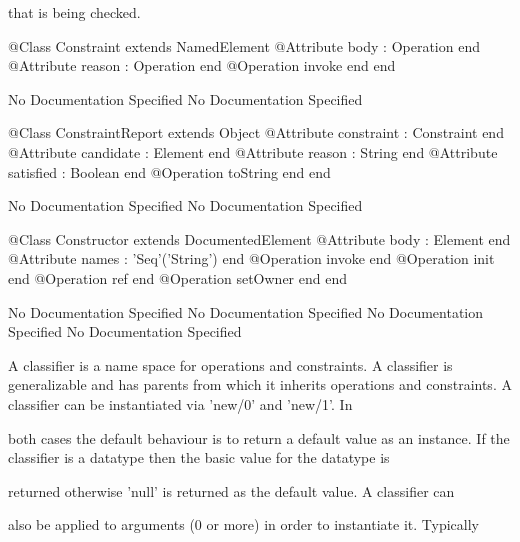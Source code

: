       that is being checked.
\begin{Interface}
@Class Constraint extends NamedElement
  @Attribute body : Operation end
  @Attribute reason : Operation end
  @Operation invoke end
end
\end{Interface}
No Documentation Specified
No Documentation Specified
\begin{Interface}
@Class ConstraintReport extends Object
  @Attribute constraint : Constraint end
  @Attribute candidate : Element end
  @Attribute reason : String end
  @Attribute satisfied : Boolean end
  @Operation toString end
end
\end{Interface}
No Documentation Specified
No Documentation Specified
\begin{Interface}
@Class Constructor extends DocumentedElement
  @Attribute body : Element end
  @Attribute names : 'Seq'('String') end
  @Operation invoke end
  @Operation init end
  @Operation ref end
  @Operation setOwner end
end
\end{Interface}
No Documentation Specified
No Documentation Specified
No Documentation Specified
No Documentation Specified

      A classifier is a name space for operations and constraints. A classifier 
      is generalizable and has parents from which it inherits operations and 
      constraints. A classifier can be instantiated via 'new/0' and 'new/1'. In

      both cases the default behaviour is to return a default value as an instance.
      If the classifier is a datatype then the basic value for the datatype is

      returned otherwise 'null' is returned as the default value. A classifier can

      also be applied to arguments (0 or more) in order to instantiate it. Typically

